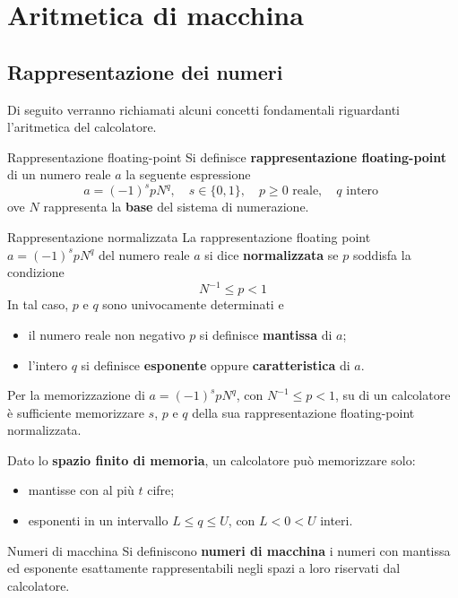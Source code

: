 \chapter{Aritmetica di macchina}

\section{Rappresentazione dei numeri}

Di seguito verranno richiamati alcuni concetti fondamentali riguardanti
l'aritmetica del calcolatore.
\begin{definition}{Rappresentazione floating-point}
    Si definisce \textbf{rappresentazione floating-point} di un numero reale $a$ la seguente
    espressione
    \[a=(-1)^{s} pN^{q},\quad s\in\{0,1\},\quad p\geq0\text{ reale},\quad q\text{ intero }\]
    ove $N$ rappresenta la \textbf{base} del sistema di numerazione.
\end{definition}

\begin{definition}{Rappresentazione normalizzata}
    La rappresentazione floating point $a=(-1)^{s} pN^{q}$ del numero reale $a$ si dice
    \textbf{normalizzata} se $p$ soddisfa la condizione
    \[N^{-1}\leq p<1\]
    In tal caso, $p$ e $q$ sono univocamente determinati e
    \begin{itemize}
        \item il numero reale non negativo $p$ si definisce \textbf{mantissa} di $a$;
        \item l'intero $q$ si definisce \textbf{esponente} oppure \textbf{caratteristica} di $a$.
    \end{itemize}
\end{definition}

Per la memorizzazione di $a=(-1)^{s} pN^{q}$, con $N^{-1}\leq p<1$, su di un calcolatore è
sufficiente memorizzare $s$, $p$ e $q$ della sua rappresentazione floating-point normalizzata.

Dato lo \textbf{spazio finito di memoria}, un calcolatore può memorizzare solo:
\begin{itemize}
    \item mantisse con al più $t$ cifre;
    \item esponenti in un intervallo $L\leq q\leq U$, con $L<0<U$ interi.
\end{itemize}

\begin{definition}{Numeri di macchina}
    Si definiscono \textbf{numeri di macchina} i numeri con mantissa ed esponente esattamente
    rappresentabili negli spazi a loro riservati dal calcolatore.
\end{definition}

